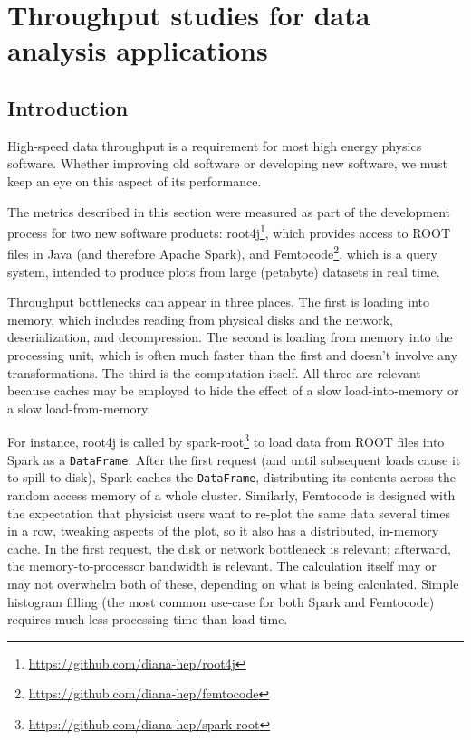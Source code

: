 \documentclass[12pt]{article}
\begin{document}
\section*{Throughput studies for data analysis applications}

\subsection*{Introduction}

High-speed data throughput is a requirement for most high energy physics software. Whether improving old software or developing new software, we must keep an eye on this aspect of its performance.

The metrics described in this section were measured as part of the development process for two new software products: root4j\footnote{\url{https://github.com/diana-hep/root4j}}, which provides access to ROOT files in Java (and therefore Apache Spark), and Femtocode\footnote{\url{https://github.com/diana-hep/femtocode}}, which is a query system, intended to produce plots from large (petabyte) datasets in real time.

Throughput bottlenecks can appear in three places. The first is loading into memory, which includes reading from physical disks and the network, deserialization, and decompression. The second is loading from memory into the processing unit, which is often much faster than the first and doesn't involve any transformations. The third is the computation itself. All three are relevant because caches may be employed to hide the effect of a slow load-into-memory or a slow load-from-memory.

For instance, root4j is called by spark-root\footnote{\url{https://github.com/diana-hep/spark-root}} to load data from ROOT files into Spark as a {\tt DataFrame}. After the first request (and until subsequent loads cause it to spill to disk), Spark caches the {\tt DataFrame}, distributing its contents across the random access memory of a whole cluster. Similarly, Femtocode is designed with the expectation that physicist users want to re-plot the same data several times in a row, tweaking aspects of the plot, so it also has a distributed, in-memory cache. In the first request, the disk or network bottleneck is relevant; afterward, the memory-to-processor bandwidth is relevant. The calculation itself may or may not overwhelm both of these, depending on what is being calculated. Simple histogram filling (the most common use-case for both Spark and Femtocode) requires much less processing time than load time.
\end{document}
